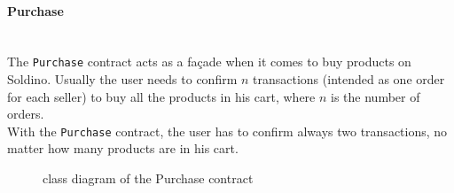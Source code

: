 \paragraph{Purchase}\mbox{}\\ 

\noindent The \texttt{Purchase} contract acts as a façade when it comes to buy products on Soldino.
Usually the user needs to confirm $n$ transactions (intended as one order for each seller) to buy all the products in his cart, where $n$ is the number of orders.\\
With the \texttt{Purchase} contract, the user has to confirm always two transactions, no matter how many products are in his cart. 
\begin{figure}[H]
	\centering
	\caption{class diagram of the Purchase contract}
\end{figure}